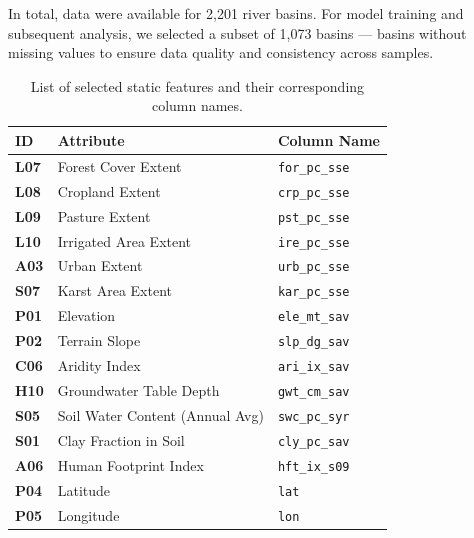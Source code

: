 In total, data were available for 2,201 river basins. For model training and subsequent analysis, we selected a subset of 1,073 basins --- basins without missing values to ensure data quality and consistency across samples.

\begin{table}[ht]
    \centering
    \begin{tabular}{lll}
        \toprule
        \textbf{ID}  & \textbf{Attribute}              & \textbf{Column Name}  \\
        \midrule
        \textbf{L07} & Forest Cover Extent             & \texttt{for\_pc\_sse} \\
        \textbf{L08} & Cropland Extent                 & \texttt{crp\_pc\_sse} \\
        \textbf{L09} & Pasture Extent                  & \texttt{pst\_pc\_sse} \\
        \textbf{L10} & Irrigated Area Extent           & \texttt{ire\_pc\_sse} \\
        \textbf{A03} & Urban Extent                    & \texttt{urb\_pc\_sse} \\
        \textbf{S07} & Karst Area Extent               & \texttt{kar\_pc\_sse} \\
        \textbf{P01} & Elevation                       & \texttt{ele\_mt\_sav} \\
        \textbf{P02} & Terrain Slope                   & \texttt{slp\_dg\_sav} \\
        \textbf{C06} & Aridity Index                   & \texttt{ari\_ix\_sav} \\
        \textbf{H10} & Groundwater Table Depth         & \texttt{gwt\_cm\_sav} \\
        \textbf{S05} & Soil Water Content (Annual Avg) & \texttt{swc\_pc\_syr} \\
        \textbf{S01} & Clay Fraction in Soil           & \texttt{cly\_pc\_sav} \\
        \textbf{A06} & Human Footprint Index           & \texttt{hft\_ix\_s09} \\
        \textbf{P04} & Latitude                        & \texttt{lat}          \\
        \textbf{P05} & Longitude                       & \texttt{lon}          \\
        \bottomrule
    \end{tabular}
    \caption{List of selected static features and their corresponding column names.}
    \label{table:static-attributes}
\end{table}

